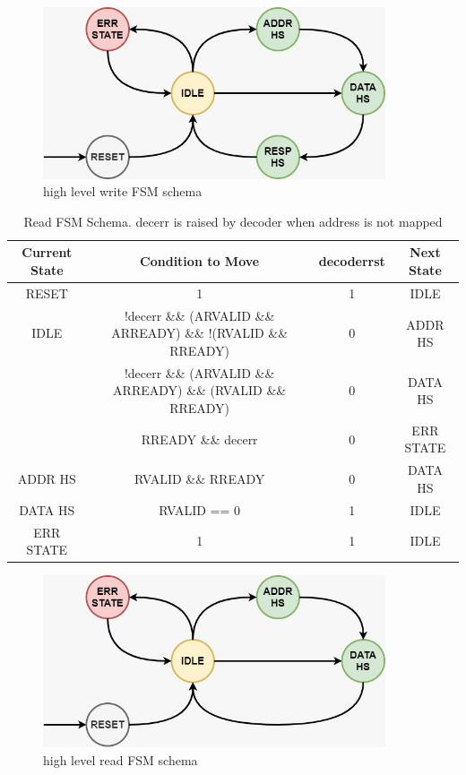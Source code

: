 \begin{figure}[!h]
  \includegraphics[width=0.9\textwidth, angle=0]{"./../../img/Images/writeFSMSchema"}
  \caption{high level write FSM schema}
  \label{writeFSMSchema}
\end{figure}

\begin{table} [!h]
  \centering
  \begin{tabular} {c | c | c | c}
    Current State	& Condition to Move &	decoderrst & Next State \\
    \hline
    \hline
    RESET &	1	& 1	& IDLE \\
    \hline
    IDLE & \small {!decerr \&\& (ARVALID \&\& ARREADY) \&\& !(RVALID \&\& RREADY)} &	0	& ADDR HS \\
    & \small{!decerr \&\& (ARVALID \&\& ARREADY) \&\& (RVALID \&\& RREADY)} &	0	& DATA HS \\
    & RREADY \&\& decerr &	0 &	ERR STATE \\
    \hline
    ADDR HS	& RVALID \&\& RREADY &	0	& DATA HS \\
    \hline
    DATA HS	& RVALID == 0 &	1 &	IDLE \\
    \hline
    ERR STATE &	1	& 1 &	IDLE \\
    \hline
  \end{tabular}
  \caption{Read FSM Schema. decerr is raised by decoder when address is not mapped}
  \label{readFSMSchemaTab}
\end{table}

\begin{figure}[!h]
  \includegraphics[width=0.9\textwidth, angle=0]{"./../../img/Images/readFSMSchema"}
  \caption{high level read FSM schema}
  \label{readFSMSchema}
\end{figure}

